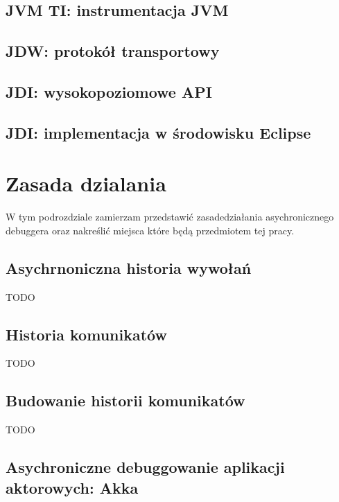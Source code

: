 \subsection{JVM TI: instrumentacja JVM}

\subsection{JDW: protokół transportowy}

\subsection{JDI: wysokopoziomowe API}

\subsection{JDI: implementacja w środowisku Eclipse}


\section{Zasada dzialania}

W tym podrozdziale zamierzam przedstawić zasadedziałania asychronicznego debuggera oraz nakreślić  miejsca które będą przedmiotem tej pracy.

\subsection{Asychrnoniczna historia wywołań}
TODO
\subsection{Historia komunikatów}
TODO
\subsection{Budowanie historii komunikatów}

TODO

\subsection{Asychroniczne debuggowanie aplikacji aktorowych: Akka}